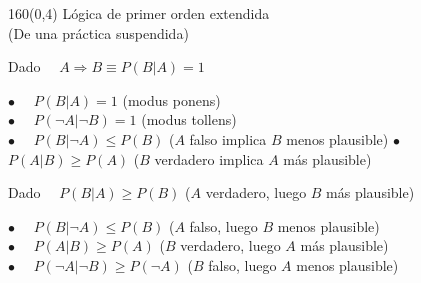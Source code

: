 \documentclass[shownotes,aspectratio=169]{beamer}
\begin{document}
\begin{frame}[plain]
\begin{textblock}{160}(0,4)
 \centering \LARGE Lógica de primer orden extendida \\
 \Large (De una práctica suspendida)
 \end{textblock}
 \vspace{1.5cm}
 
Dado \ \ $A \Rightarrow B  \equiv P(B|A) = 1$ 

\pause 

$\bullet$ \ \ $P(B|A) = 1$ (modus ponens) \\
$\bullet$ \ \ $P(\neg A| \neg B) = 1$ (modus tollens) \\
\pause
$\bullet$ \ \ $P(B| \neg A) \leq P(B) $ ($A$ falso implica $B$ menos plausible)
$\bullet$ \ \ $P(A|B) \geq P(A) $ ($B$ verdadero implica $A$ más plausible) 
 
 \vspace{0.6cm}
 
Dado \ \ $P(B|A) \geq P(B)$ ($A$ verdadero, luego $B$ más plausible) \\

\pause 

$\bullet$ \ \ $P(B|\neg A) \leq P(B)$ ($A$ falso, luego $B$ menos plausible) \\
$\bullet$ \ \ $P(A|B) \geq P(A)$ ($B$ verdadero, luego $A$ más plausible) \\
$\bullet$ \ \ $P(\neg A|\neg B) \geq P(\neg A)$ ($B$ falso, luego $A$ menos plausible)
 
 
\end{frame}
\end{document}
